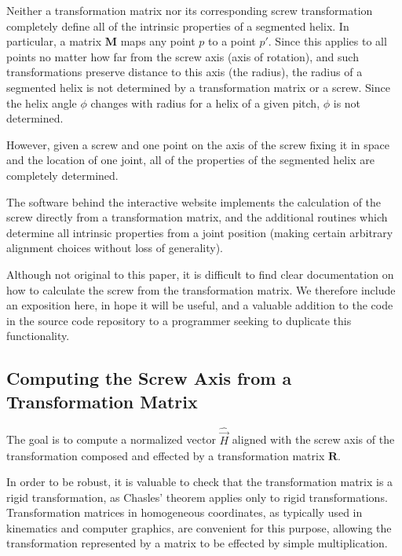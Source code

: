 \documentclass[11pt]{article}
\begin{document}
{Neither a transformation matrix nor its corresponding screw transformation
completely define all of the intrinsic
properties of a segmented helix. In particular, a matrix $\bm{M}$ maps any point $p$ to a point $p'$.
Since this applies to all points no matter how far from the screw axis (axis of rotation), and
such transformations preserve distance to this axis (the radius), the radius of a segmented helix
is not determined by a transformation matrix or a screw. Since the helix angle $\phi$ changes
with radius for a helix of a given pitch, $\phi$ is not determined.

However, given a screw and one point on the axis of the screw fixing it in space
and the location of one joint, all of the properties of the segmented helix are completely determined.

The software behind the interactive website implements the calculation of the screw
directly from a transformation matrix, and
the additional routines which determine all intrinsic properties from a joint position (making
certain arbitrary alignment choices without loss of generality).

Although not original to this paper, it is
difficult to find clear documentation on how to calculate the
screw from the transformation matrix.
We therefore include an exposition here, in hope it will be useful,
and a valuable addition to the code in the source code repository to a programmer seeking to duplicate
this functionality.

\subsection{Computing the Screw Axis from a Transformation Matrix}

The goal is to compute a normalized vector $\hat{\overrightarrow{H}}$ aligned with the screw
axis of the transformation composed and effected by a transformation matrix $\bm{R}$.

In order to be robust, it is valuable to check that the transformation
matrix is a rigid transformation\cite{wiki:rigid},
as Chasles' theorem applies only to rigid transformations.
Transformation matrices in homogeneous coordinates, as typically used in kinematics
and computer graphics, are convenient for this purpose, allowing the transformation
represented by a matrix to be effected by simple multiplication.

}
\end{document}
